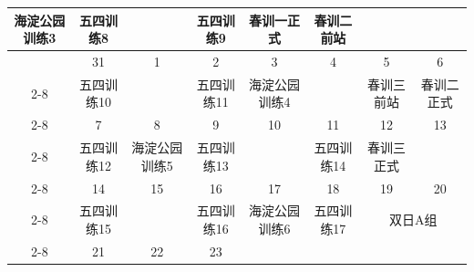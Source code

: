 \documentclass[UTF8]{ctexart}
\begin{document}
\begin{table}[h]
{\begin{tabular}{|c|ccccc|cc|}
      \multicolumn{1}{c|}{\cellcolor[HTML]{68CBD0}海淀公园训练3} &
      \multicolumn{1}{c|}{\cellcolor[HTML]{F8A102}五四训练8} &
      \multicolumn{1}{c|}{} &
      \cellcolor[HTML]{F8A102}五四训练9 &
      \multicolumn{1}{c|}{\cellcolor[HTML]{FFCC67}春训一正式} &
      \cellcolor[HTML]{FFCC67}春训二前站 \\ \hline
    \cellcolor[HTML]{34FF34} &
      \multicolumn{1}{c|}{31} &
      \multicolumn{1}{c|}{1} &
      \multicolumn{1}{c|}{2} &
      \multicolumn{1}{c|}{3} &
      \cellcolor[HTML]{FFFE65}4 &
      \multicolumn{1}{c|}{\cellcolor[HTML]{FFFE65}5} &
      \cellcolor[HTML]{FFFE65}6 \\ \cline{2-8} 
    \cellcolor[HTML]{34FF34} &
      \multicolumn{1}{c|}{\cellcolor[HTML]{F8A102}五四训练10} &
      \multicolumn{1}{c|}{} &
      \multicolumn{1}{c|}{\cellcolor[HTML]{F8A102}五四训练11} &
      \multicolumn{1}{c|}{\cellcolor[HTML]{68CBD0}海淀公园训练4} &
       &
      \multicolumn{1}{c|}{\cellcolor[HTML]{FFCC67}春训三前站} &
      \cellcolor[HTML]{FFCC67}春训二正式 
       \\ \cline{2-8} 
    \cellcolor[HTML]{34FF34} &
      \multicolumn{1}{c|}{7} &
      \multicolumn{1}{c|}{8} &
      \multicolumn{1}{c|}{9} &
      \multicolumn{1}{c|}{10} &
      11 &
      \multicolumn{1}{c|}{12} &
      13 \\ \cline{2-8} 
    \cellcolor[HTML]{34FF34} &
      \multicolumn{1}{c|}{\cellcolor[HTML]{F8A102}五四训练12} &
      \multicolumn{1}{c|}{\cellcolor[HTML]{68CBD0}海淀公园训练5} &
      \multicolumn{1}{c|}{\cellcolor[HTML]{F8A102}五四训练13} &
      \multicolumn{1}{c|}{} &
      \cellcolor[HTML]{F8A102}五四训练14 &
      \multicolumn{1}{c|}{\cellcolor[HTML]{FFCC67}春训三正式} &
       \\ \cline{2-8} 
    \cellcolor[HTML]{34FF34} &
      \multicolumn{1}{c|}{14} &
      \multicolumn{1}{c|}{15} &
      \multicolumn{1}{c|}{16} &
      \multicolumn{1}{c|}{17} &
      18 &
      \multicolumn{1}{c|}{19} &
      20 \\ \cline{2-8} 
    \cellcolor[HTML]{34FF34} &
      \multicolumn{1}{c|}{\cellcolor[HTML]{F8A102}五四训练15} &
      \multicolumn{1}{c|}{} &
      \multicolumn{1}{c|}{\cellcolor[HTML]{F8A102}五四训练16} &
      \multicolumn{1}{c|}{\cellcolor[HTML]{68CBD0}海淀公园训练6} &
      \cellcolor[HTML]{F8A102}五四训练17 &
      \multicolumn{2}{c|}{\cellcolor[HTML]{FFCC67}双日A组} \\ \cline{2-8} 
    \cellcolor[HTML]{34FF34} &
      \multicolumn{1}{c|}{21} &
      \multicolumn{1}{c|}{22} &
      \multicolumn{1}{c|}{23} &

\end{tabular}}
\end{table}
\end{document}
